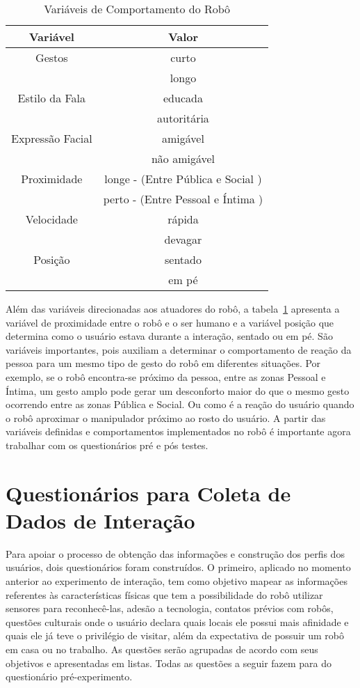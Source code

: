 \begin{table}[!ht]
	\caption{Variáveis de Comportamento do Robô}
	\label{tab:variaveisvalores}
	\centering
	\begin{tabular}{c | c}
		\hline
		Variável & Valor \\
		\hline
		Gestos & curto \\
		& longo \\
		\hline
		Estilo da Fala & educada \\
		& autoritária \\
		\hline
		Expressão Facial & amigável \\
		& não amigável \\
		\hline
		Proximidade & longe - (Entre Pública e Social ) \\
		& perto - (Entre Pessoal e Íntima ) \\
		\hline
		Velocidade & rápida \\
		& devagar \\
		\hline
		Posição & sentado \\
		& em pé \\
		\hline
	\end{tabular}
\end{table}

Além das variáveis direcionadas aos atuadores do robô, a tabela~\ref{tab:variaveisvalores} apresenta a variável de proximidade entre o robô e o ser humano e a variável posição que determina como o usuário estava durante a interação, sentado ou em pé. São variáveis importantes, pois auxiliam a determinar o comportamento de reação da pessoa para um mesmo tipo de gesto do robô em diferentes situações. Por exemplo, se o robô encontra-se próximo da pessoa, entre as zonas Pessoal e Íntima, um gesto amplo pode gerar um desconforto maior do que o mesmo gesto ocorrendo entre as zonas Pública e Social. Ou como é a reação do usuário quando o robô aproximar o manipulador próximo ao rosto do usuário.  A partir das variáveis definidas e comportamentos implementados no robô é importante agora trabalhar com os questionários pré e pós testes.

\section{Questionários para Coleta de Dados de Interação}
\label{sec:questionarios}
Para apoiar o processo de obtenção das informações e construção dos perfis dos usuários, dois questionários foram construídos. O primeiro, aplicado no momento anterior ao experimento de interação, tem como objetivo mapear as informações referentes às características físicas que tem a possibilidade do robô utilizar sensores para reconhecê-las, adesão a tecnologia, contatos prévios com robôs, questões culturais onde o usuário declara quais locais ele possui mais afinidade e quais ele já teve o privilégio de visitar, além da expectativa de possuir um robô em casa ou no trabalho. As questões serão agrupadas de acordo com seus objetivos e apresentadas em listas. Todas as questões a seguir fazem para do questionário pré-experimento.

